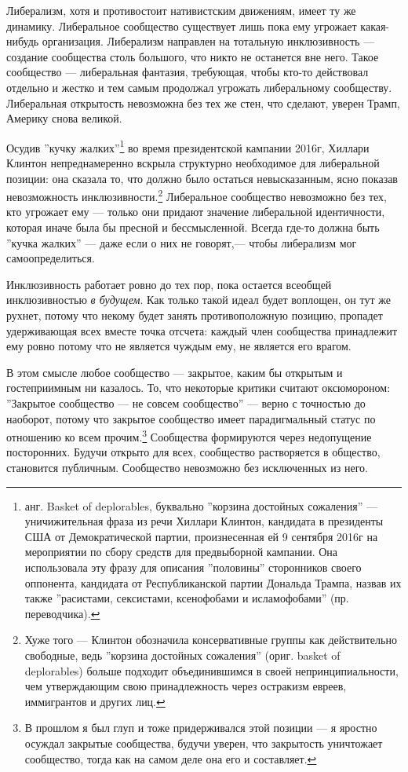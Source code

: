 \documentclass[12pt]{book}
\begin{document}
Либерализм, хотя и противостоит нативистским движениям, имеет ту же динамику. Либеральное сообщество существует лишь пока ему угрожает какая-нибудь организация. Либерализм направлен на тотальную инклюзивность --- создание сообщества столь большого, что никто не останется вне него. Такое сообщество --- либеральная фантазия, требующая, чтобы кто-то действовал отдельно и жестко и тем самым продолжал угрожать либеральному сообществу. Либеральная открытость невозможна без тех же стен, что сделают, уверен Трамп, Америку снова великой.

Осудив ''кучку жалких''\footnote{анг. Basket of deplorables, буквально ''корзина достойных сожаления'' --- уничижительная фраза из речи Хиллари Клинтон, кандидата в президенты США от Демократической партии, произнесенная ей 9 сентября 2016г на мероприятии по сбору средств для предвыборной кампании. Она использовала эту фразу для описания ''половины'' сторонников своего оппонента, кандидата от Республиканской партии Дональда Трампа, назвав их также ''расистами, сексистами, ксенофобами и исламофобами'' (пр. переводчика).} во время президентской кампании 2016г, Хиллари Клинтон непреднамеренно вскрыла структурно необходимое для либеральной позиции: она сказала то, что должно было остаться невысказанным, ясно показав невозможность инклюзивности.\footnote{Хуже того --- Клинтон обозначила консервативные группы как действительно свободные, ведь ''корзина достойных сожаления'' (ориг. basket of deplorables) больше подходит объединившимся в своей непринципиальности, чем утверждающим свою принадлежность через остракизм евреев, иммигрантов и других лиц.} Либеральное сообщество невозможно без тех, кто угрожает ему --- только они придают значение либеральной идентичности, которая иначе была бы пресной и бессмысленной. Всегда где-то должна быть ''кучка жалких'' --- даже если о них не говорят,--- чтобы либерализм мог самоопределиться.

Инклюзивность работает ровно до тех пор, пока остается всеобщей инклюзивностью \textit{в будущем}. Как только такой идеал будет воплощен, он тут же рухнет, потому что некому будет занять противоположную позицию, пропадет удерживающая всех вместе точка отсчета: каждый член сообщества принадлежит ему ровно потому что не является чуждым ему, не является его врагом.

В этом смысле любое сообщество --- закрытое, каким бы открытым и гостеприимным ни казалось. То, что некоторые критики считают оксюмороном: ''Закрытое сообщество --- не совсем сообщество'' --- верно с точностью до наоборот, потому что закрытое сообщество имеет парадигмальный статус по отношению ко всем прочим.\footnote{В прошлом я был глуп и тоже придерживался этой позиции --- я яростно осуждал закрытые сообщества, будучи уверен, что закрытость уничтожает сообщество, тогда как на самом деле она его и составляет.} Сообщества формируются через недопущение посторонних. Будучи открыто для всех, сообщество растворяется в общество, становится публичным. Сообщество невозможно без исключенных из него.
\end{document}
